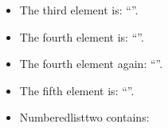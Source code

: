 \documentclass{article}
\newcommand{\fourthelement}{\getnthelement{4}}
\begin{document}

\begin{itemize}
\item The third element is: ``''.
\item The fourth element is: ``\fourthelement''.
\item The fourth element again: ``\fourthelement''.
\item The fifth element is: ``''.
\item Numberedlisttwo contains: 
\end{itemize}


\texttt{\meaning\playaroundelement}
\end{document}
